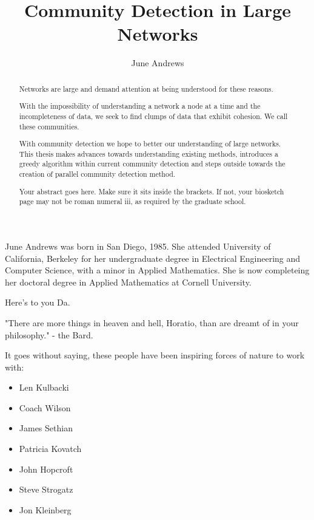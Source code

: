\documentclass[phd,tocprelim]{cornell}
\title {Community Detection in Large Networks}
\author {June Andrews}
\begin{document}
\maketitle
\makecopyright

\begin{abstract}
Networks are large and demand attention at being understood for these reasons.

With the impossibility of understanding a network a node at a time and the incompleteness of data, we seek to find clumps of data that exhibit cohesion.  We call these communities.

With community detection we hope to better our understanding of large networks.  This thesis makes advances towards understanding existing methods, introduces a greedy algorithm within current community detection and steps outside towards the creation of parallel community detection method.

Your abstract goes here. Make sure it sits inside the brackets. If not,
your biosketch page may not be roman numeral iii, as required by the
graduate school.
\end{abstract}

\begin{biosketch}
June Andrews was born in San Diego, 1985.
She attended University of California, Berkeley for her undergraduate degree in Electrical Engineering and Computer Science, with a minor in Applied Mathematics.
She is now completeing her doctoral degree in Applied Mathematics at Cornell University.
\end{biosketch}

\begin{dedication}
Here's to you Da.

"There are more things in heaven and hell, Horatio, than are dreamt of in your philosophy." - the Bard.
\end{dedication}

\begin{acknowledgements}
It goes without saying, these people have been inspiring forces of nature to work with:
\begin{itemize}
\item Len Kulbacki
\item Coach Wilson
\item James Sethian
\item Patricia Kovatch
\item John Hopcroft
\item Steve Strogatz
\item Jon Kleinberg
\end{itemize}
\end{acknowledgements}
\end{document}
